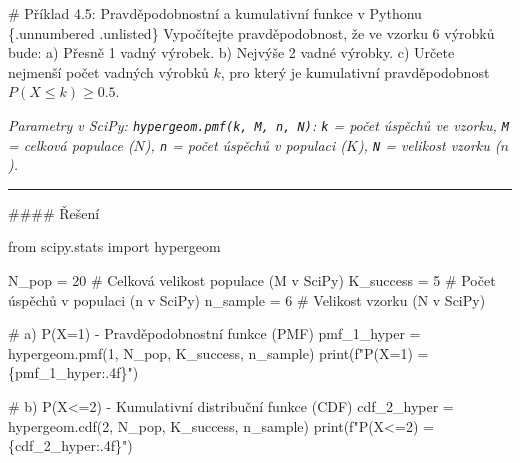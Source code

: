 \documentclass[
  czech,
  11pt,
  letterpaper,
  DIV=11,
  numbers=noendperiod]{scrreprt}
\newenvironment{Shaded}{\begin{snugshade}}{\end{snugshade}}
\newcommand{\BuiltInTok}[1]{\textcolor[rgb]{0.00,0.23,0.31}{#1}}
\newcommand{\CommentTok}[1]{\textcolor[rgb]{0.37,0.37,0.37}{#1}}
\newcommand{\DecValTok}[1]{\textcolor[rgb]{0.68,0.00,0.00}{#1}}
\newcommand{\ImportTok}[1]{\textcolor[rgb]{0.00,0.46,0.62}{#1}}
\newcommand{\NormalTok}[1]{\textcolor[rgb]{0.00,0.23,0.31}{#1}}
\newcommand{\OperatorTok}[1]{\textcolor[rgb]{0.37,0.37,0.37}{#1}}
\newcommand{\SpecialCharTok}[1]{\textcolor[rgb]{0.37,0.37,0.37}{#1}}
\newcommand{\SpecialStringTok}[1]{\textcolor[rgb]{0.13,0.47,0.30}{#1}}
\begin{document}
\begin{tcolorbox}[enhanced jigsaw, arc=.35mm, bottomrule=.15mm, bottomtitle=1mm, breakable, colback=white, colbacktitle=quarto-callout-note-color!10!white, colframe=quarto-callout-note-color-frame, coltitle=black, left=2mm, leftrule=.75mm, opacityback=0, opacitybacktitle=0.6, rightrule=.15mm, title=\textcolor{quarto-callout-note-color}{\faInfo}\hspace{0.5em}{Poznámka}, titlerule=0mm, toprule=.15mm, toptitle=1mm]

\# Příklad 4.5: Pravděpodobnostní a kumulativní funkce v Pythonu
\{.unnumbered .unlisted\} Vypočítejte pravděpodobnost, že ve vzorku 6
výrobků bude: a) Přesně 1 vadný výrobek. b) Nejvýše 2 vadné výrobky. c)
Určete nejmenší počet vadných výrobků \(k\), pro který je kumulativní
pravděpodobnost \(P(X \le k) \ge 0.5\).

\emph{Parametry v SciPy: \texttt{hypergeom.pmf(k,\ M,\ n,\ N)}:
\texttt{k} = počet úspěchů ve vzorku, \texttt{M} = celková populace
(\(N\)), \texttt{n} = počet úspěchů v populaci (\(K\)), \texttt{N} =
velikost vzorku (\(n\)).}

\begin{center}\rule{0.5\linewidth}{0.5pt}\end{center}

\#\#\#\# Řešení

\begin{Shaded}
\begin{Highlighting}[]
\ImportTok{from}\NormalTok{ scipy.stats }\ImportTok{import}\NormalTok{ hypergeom}

\NormalTok{N\_pop }\OperatorTok{=} \DecValTok{20}  \CommentTok{\# Celková velikost populace (M v SciPy)}
\NormalTok{K\_success }\OperatorTok{=} \DecValTok{5} \CommentTok{\# Počet úspěchů v populaci (n v SciPy)}
\NormalTok{n\_sample }\OperatorTok{=} \DecValTok{6} \CommentTok{\# Velikost vzorku (N v SciPy)}

\CommentTok{\# a) P(X=1) {-} Pravděpodobnostní funkce (PMF)}
\NormalTok{pmf\_1\_hyper }\OperatorTok{=}\NormalTok{ hypergeom.pmf(}\DecValTok{1}\NormalTok{, N\_pop, K\_success, n\_sample)}
\BuiltInTok{print}\NormalTok{(}\SpecialStringTok{f"P(X=1) = }\SpecialCharTok{\{}\NormalTok{pmf\_1\_hyper}\SpecialCharTok{:.4f\}}\SpecialStringTok{"}\NormalTok{)}

\CommentTok{\# b) P(X\textless{}=2) {-} Kumulativní distribuční funkce (CDF)}
\NormalTok{cdf\_2\_hyper }\OperatorTok{=}\NormalTok{ hypergeom.cdf(}\DecValTok{2}\NormalTok{, N\_pop, K\_success, n\_sample)}
\BuiltInTok{print}\NormalTok{(}\SpecialStringTok{f"P(X\textless{}=2) = }\SpecialCharTok{\{}\NormalTok{cdf\_2\_hyper}\SpecialCharTok{:.4f\}}\SpecialStringTok{"}\NormalTok{)}


\end{Highlighting}
\end{Shaded}
\end{tcolorbox}
\end{document}

